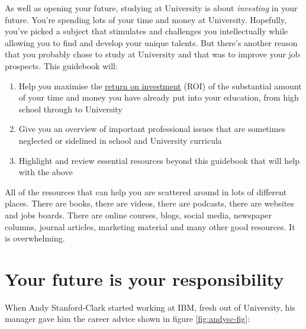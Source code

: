 \documentclass[
]{book}
\providecommand{\tightlist}{%
  \setlength{\itemsep}{0pt}\setlength{\parskip}{0pt}}
\begin{document}
As well as opening your future, studying at University is about \emph{investing} in your future. You're spending lots of your time and money at University. Hopefully, you've picked a subject that stimulates and challenges you intellectually while allowing you to find and develop your unique talents. But there's another reason that you probably chose to study at University and that was to improve your job prospects. This guidebook will:

\begin{enumerate}
\def\labelenumi{\arabic{enumi}.}
\tightlist
\item
  Help you maximise the \href{https://en.wikipedia.org/wiki/Return_on_investment}{return on investment} (ROI) of the substantial amount of your time and money you have already put into your education, from high school through to University
\item
  Give you an overview of important professional issues that are sometimes neglected or sidelined in school and University curricula
\item
  Highlight and review essential resources beyond this guidebook that will help with the above
\end{enumerate}

All of the resources that can help you are scattered around in lots of different places. There are books, there are videos, there are podcasts, there are websites and jobs boards. There are online courses, blogs, social media, newspaper columns, journal articles, marketing material and many other good resources. It is overwhelming.

\hypertarget{responsibility}{%
\section{Your future is your responsibility}\label{responsibility}}

When Andy Stanford-Clark started working at IBM, fresh out of University, his manager gave him the career advice shown in figure \ref{fig:andysc-fig}:
\end{document}
